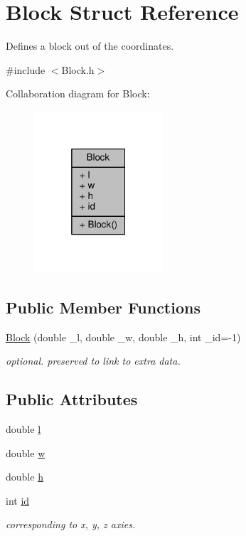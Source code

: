 \hypertarget{structBlock}{}\section{Block Struct Reference}
\label{structBlock}


Defines a block out of the coordinates.  




{\ttfamily \#include $<$Block.\+h$>$}



Collaboration diagram for Block\+:
\nopagebreak
\begin{figure}[H]
\begin{center}
\leavevmode
\includegraphics[width=136pt]{structBlock__coll__graph}
\end{center}
\end{figure}
\subsection*{Public Member Functions}
\begin{DoxyCompactItemize}
\item 
\hyperlink{structBlock_a832b4a589a691d3e10cfecc32398ddd0}{Block} (double \+\_\+l, double \+\_\+w, double \+\_\+h, int \+\_\+id=-\/1)
\begin{DoxyCompactList}\small\item\em optional. preserved to link to extra data. \end{DoxyCompactList}\end{DoxyCompactItemize}
\subsection*{Public Attributes}
\begin{DoxyCompactItemize}
\item 
double \hyperlink{structBlock_aad415a5d98d3645561306bf7d5bb22bb}{l}
\item 
double \hyperlink{structBlock_ae072df7850e56bf12d0234773e7eaa46}{w}
\item 
double \hyperlink{structBlock_a27826799e87ce49b8b1b72e7e2384583}{h}
\item 
int \hyperlink{structBlock_a86f38c868a8dab090101db6492078071}{id}
\begin{DoxyCompactList}\small\item\em corresponding to x, y, z axies. \end{DoxyCompactList}\end{DoxyCompactItemize}


